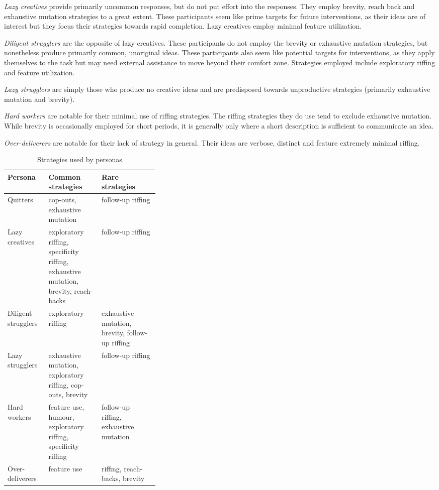 \emph{Lazy creatives} provide primarily uncommon responses, but do not put effort into the responses. They employ brevity, reach back and exhaustive mutation strategies to a great extent. These participants seem like prime targets for future interventions, as their ideas are of interest but they focus their strategies towards rapid completion. Lazy creatives employ minimal feature utilization.

\emph{Diligent strugglers} are the opposite of lazy creatives. These participants do not employ the brevity or exhaustive mutation strategies, but nonetheless produce primarily common, unoriginal ideas. These participants also seem like potential targets for interventions, as they apply themselves to the task but may need external assistance to move beyond their comfort zone. Strategies employed include exploratory riffing and feature utilization.

\emph{Lazy strugglers} are simply those who produce no creative ideas and are predisposed towards unproductive strategies (primarily exhaustive mutation and brevity).

\emph{Hard workers} are notable for their minimal use of riffing strategies. The riffing strategies they do use tend to exclude exhaustive mutation. While brevity is occasionally employed for short periods, it is generally only where a short description is sufficient to communicate an idea.

\emph{Over-deliverers} are notable for their lack of strategy in general. Their ideas are verbose, distinct and feature extremely minimal riffing. 

\begin{table*}
    \begin{tabular}{|l|p{0.35\linewidth}|l|}
        \hline
        \textbf{Persona} & \textbf{Common strategies} & \textbf{Rare strategies} \\
        \hline
        Quitters & cop-outs, exhaustive mutation & follow-up riffing \\
        \hline
        Lazy creatives & exploratory riffing, specificity riffing, \newline
        exhaustive mutation, brevity, reach-backs  & follow-up riffing  \\
        \hline
        Diligent strugglers & exploratory riffing & exhaustive mutation, brevity, \newline
        follow-up riffing \\
        \hline
        Lazy strugglers & exhaustive mutation, exploratory riffing, \newline
        cop-outs, brevity  & follow-up riffing \\
        \hline
        Hard workers & feature use, humour, \newline
        exploratory riffing, specificity riffing  & follow-up riffing, exhaustive mutation \\
        \hline
        Over-deliverers & feature use & riffing, reach-backs, brevity \\
        \hline
    \end{tabular}
    \caption{Strategies used by personas}
\end{table*}

